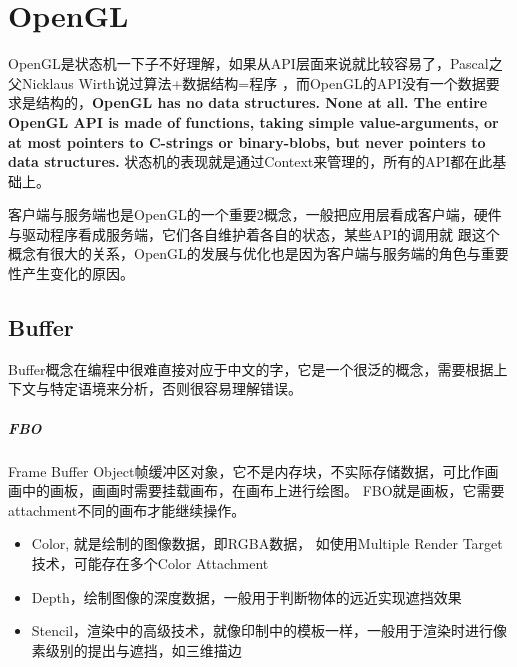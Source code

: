 \chapter{OpenGL}

OpenGL是状态机一下子不好理解，如果从API层面来说就比较容易了，Pascal之父Nicklaus Wirth说过算法+数据结构=程序
，而OpenGL的API没有一个数据要求是结构的，\textbf{OpenGL has no data structures. None at all. The entire OpenGL API is made of functions, taking simple value-arguments, or at most pointers to C-strings or binary-blobs, but never pointers to data structures.}
状态机的表现就是通过Context来管理的，所有的API都在此基础上。

客户端与服务端也是OpenGL的一个重要2概念，一般把应用层看成客户端，硬件与驱动程序看成服务端，它们各自维护着各自的状态，某些API的调用就
跟这个概念有很大的关系，OpenGL的发展与优化也是因为客户端与服务端的角色与重要性产生变化的原因。

\section{Buffer}

Buffer概念在编程中很难直接对应于中文的字，它是一个很泛的概念，需要根据上下文与特定语境来分析，否则很容易理解错误。

\paragraph{FBO}

Frame Buffer Object帧缓冲区对象，它不是内存块，不实际存储数据，可比作画画中的画板，画画时需要挂载画布，在画布上进行绘图。
FBO就是画板，它需要attachment不同的画布才能继续操作。

\begin{itemize}
    \item {Color, 就是绘制的图像数据，即RGBA数据， 如使用Multiple Render Target技术，可能存在多个Color Attachment}
    \item {Depth，绘制图像的深度数据，一般用于判断物体的远近实现遮挡效果}
    \item {Stencil，渲染中的高级技术，就像印制中的模板一样，一般用于渲染时进行像素级别的提出与遮挡，如三维描边}
\end{itemize}


